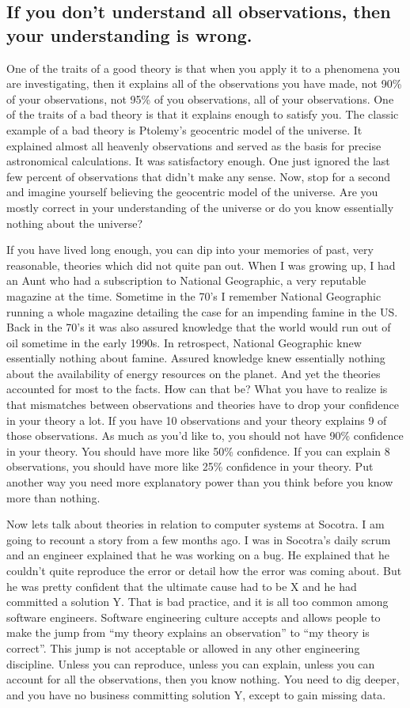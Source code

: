 \subsection{If you don't understand all observations, then your understanding is wrong.}
One of the traits of a good theory is that when you apply it to a phenomena you are investigating, then it explains all of the observations you have made, not 90\%
of your observations, not 95\% of you observations, all of your observations. One of the traits of a bad theory is that it explains enough to
satisfy you. The classic example of a bad theory is Ptolemy's geocentric model of the universe. It explained almost all heavenly observations and served as the basis
for precise astronomical calculations. It was satisfactory enough. One just ignored the last few percent of observations that didn't make any sense. Now, stop for a
second and imagine yourself believing the geocentric model of the universe. Are you mostly correct in your understanding of the universe or do you know
essentially nothing about the universe?

If you have lived long enough, you can dip into your memories of past, very reasonable, theories which did not quite pan out. When I was growing up, I had an Aunt
who had a subscription to National Geographic, a very reputable magazine at the time. Sometime in the 70's I remember National Geographic running a whole magazine
detailing the case for an impending famine in the US. Back in the 70's it was also assured knowledge that the world would run out of oil sometime in the early 1990s.
In retrospect,
National Geographic knew essentially nothing about famine. Assured knowledge knew essentially nothing about the availability of energy resources on the planet. And yet
the theories accounted for most to the facts. How can that be? What you have to realize is that mismatches between observations and theories have to
drop your confidence in your theory a lot. If you have 10 observations and your theory explains 9 of those observations. As much as you'd like to,
you should not have 90\% confidence in your theory. You should have more like 50\% confidence. If you can explain 8 observations, you should have more like 25\%
confidence in your theory. Put another way you need more explanatory power than you think before you know more than nothing.

Now lets talk about theories in relation to computer systems at Socotra. I am going to recount a story from a few months ago. I was in Socotra's daily scrum and an engineer
explained that he was working on a bug. He explained that he couldn't quite reproduce the error or detail how the error was coming about. But he was pretty confident
that the ultimate cause had to be X and he had committed a solution Y. That is bad practice, and it is all too common among software engineers. Software engineering culture
accepts and allows people to make the jump from ``my theory explains an observation'' to ``my theory is correct''. This jump is not acceptable or allowed in any other
engineering discipline. Unless you can reproduce, unless you can explain, unless you can account for all the observations, then you know nothing. You need to
dig deeper, and you have no business committing solution Y, except to gain missing data.

